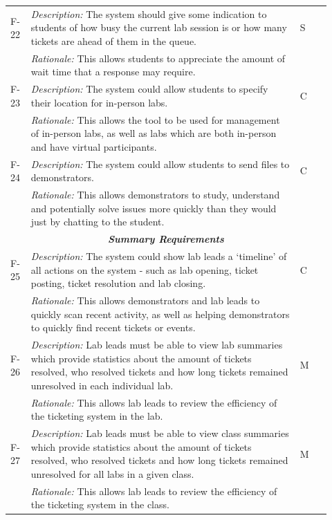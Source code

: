  \begin{table}[H]
\small
\begin{tabular}{|p{0.05\linewidth} | p{0.78\linewidth} |p{0.09\linewidth}|}
 
 
 \hline
 F-22 & \textit{Description:} The system should give some indication to students of how busy the current lab session is or how many tickets are ahead of them in the queue. & S\\
  \cline{2-2}
  & \textit{Rationale:} This allows students to appreciate the amount of wait time that a response may require. & \\

     \hline\hline
 F-23 & \textit{Description:} The system could allow students to specify their location for in-person labs. & C\\
  \cline{2-2}
  & \textit{Rationale:} This allows the tool to be used for management of in-person labs, as well as labs which are both in-person and have virtual participants. & \\
 
      \hline\hline
 F-24 & \textit{Description:} The system could allow students to send files to demonstrators. & C\\
  \cline{2-2}
  & \textit{Rationale:} This allows demonstrators to study, understand and potentially solve issues more quickly than they would just by chatting to the student. & \\
  \hline
 
  \multicolumn{3}{c}{\textit{\textbf{Summary Requirements}}}\\
  
          \hline
 F-25 & \textit{Description:} The system could show lab leads a `timeline' of all actions on the system - such as lab opening, ticket posting, ticket resolution and lab closing. & C\\
  \cline{2-2}
  & \textit{Rationale:} This allows demonstrators and lab leads to quickly scan recent activity, as well as helping demonstrators to quickly find recent tickets or events. & \\
  
\hline\hline
 F-26 & \textit{Description:} Lab leads must be able to view lab summaries which provide statistics about the amount of tickets resolved, who resolved tickets and how long tickets remained unresolved in each individual lab. & M\\
  \cline{2-2}
  & \textit{Rationale:} This allows lab leads to review the efficiency of the ticketing system in the lab. & \\

 \hline\hline
 F-27 & \textit{Description:} Lab leads must be able to view class summaries which provide statistics about the amount of tickets resolved, who resolved tickets and how long tickets remained unresolved for all labs in a given class. & M\\
  \cline{2-2}
  & \textit{Rationale:} This allows lab leads to review the efficiency of the ticketing system in the class. & \\
  \hline
  
\end{tabular}
\end{table}

